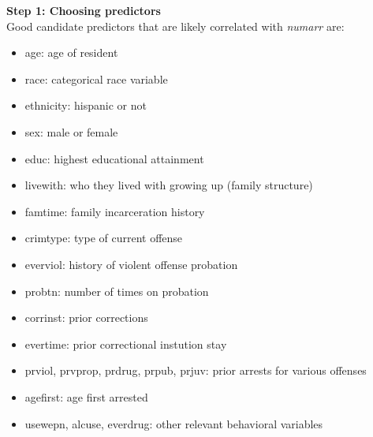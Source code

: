 \documentclass[]{article}
\begin{document}
\large{\textbf{Step 1: Choosing predictors}} \\
Good candidate predictors that are likely correlated with \textit{numarr} are:
\begin{itemize}
    \item age: age of resident
    \item race: categorical race variable 
    \item ethnicity: hispanic or not
    \item sex: male or female 
    \item educ: highest educational attainment 
    \item livewith: who they lived with growing up (family structure)
    \item famtime: family incarceration history
    \item crimtype: type of current offense 
    \item everviol: history of violent offense probation
    \item probtn: number of times on probation
    \item corrinst: prior corrections
    \item evertime: prior correctional instution stay 
    \item prviol, prvprop, prdrug, prpub, prjuv: prior arrests for various offenses
    \item agefirst: age first arrested
    \item usewepn, alcuse, everdrug: other relevant behavioral variables 
\end{itemize}
\end{document}
